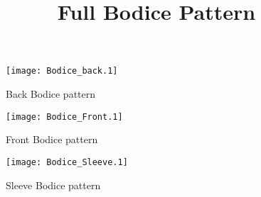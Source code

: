 \documentclass[12pt,landscape]{article}
\begin{document}
\date{}
\title {Full Bodice Pattern}
\maketitle

\begin{figure}[!ht]

\texttt{[image: Bodice\_back.1]}
\caption{Back Bodice pattern}

\end{figure}

\begin{figure}[!ht]

\texttt{[image: Bodice\_Front.1]}
\caption{Front Bodice pattern}

\end{figure}


\begin{figure}[!ht]

\texttt{[image: Bodice\_Sleeve.1]}
\caption{Sleeve Bodice pattern}

\end{figure}
\end{document}
